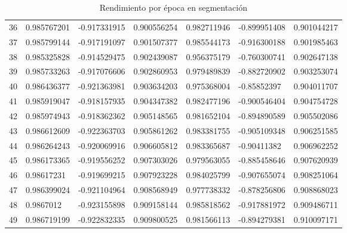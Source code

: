 \begin{table}[H]
{\begin{tabular}{@{}lllllll@{}}
        36 & 0.985767201 & -0.917331915 & 0.900556254 & 0.982711946 & -0.899951408 & 0.901044217 \\
        37 & 0.985799144 & -0.917191097 & 0.901507377 & 0.985544173 & -0.916300188 & 0.901985463 \\
        38 & 0.985325828 & -0.914529475 & 0.902439087 & 0.956375179 & -0.760300741 & 0.902647138 \\
        39 & 0.985733263 & -0.917076606 & 0.902860953 & 0.979489839 & -0.882720902 & 0.903253074 \\
        40 & 0.986436377 & -0.921363981 & 0.903634203 & 0.975368004 & -0.85852397 & 0.904011707 \\
        41 & 0.985919047 & -0.918157935 & 0.904347382 & 0.982477196 & -0.900546404 & 0.904754728 \\
        42 & 0.985974943 & -0.918362362 & 0.905148565 & 0.981652104 & -0.894890589 & 0.905502086 \\
        43 & 0.986612609 & -0.922363703 & 0.905861262 & 0.983381755 & -0.905109348 & 0.906251585 \\
        44 & 0.986264243 & -0.920069916 & 0.906605812 & 0.983365687 & -0.90411382 & 0.906962252 \\
        45 & 0.986173365 & -0.919556252 & 0.907303026 & 0.979563055 & -0.885458646 & 0.907620939 \\
        46 & 0.98617231 & -0.919699215 & 0.907923228 & 0.984025799 & -0.907655074 & 0.908251064 \\
        47 & 0.986399024 & -0.921104964 & 0.908568949 & 0.977738332 & -0.878256806 & 0.908868023 \\
        48 & 0.9867012 & -0.923155898 & 0.909158144 & 0.985818562 & -0.917881972 & 0.909486711 \\
        49 & 0.986719199 & -0.922832335 & 0.909800525 & 0.981566113 & -0.894279381 & 0.910097171 \\ \bottomrule
     
        \end{tabular}%
        }
        \caption{Rendimiento por época en segmentación}\label{fig:rendseg}
        \end{table}
